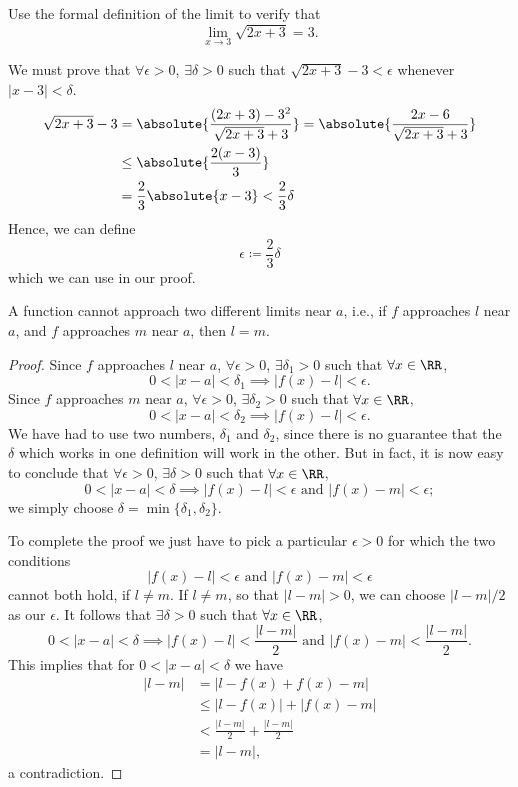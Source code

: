 \begin{exercise}
Use the formal definition of the limit to verify that 
\[ \lim_{x \to 3} \sqrt{2x+3} = 3. \]
\end{exercise}

We must prove that $\forall \epsilon > 0$, $\exists \delta > 0$ such that $\sqrt{2x+3} - 3 < \epsilon$ whenever $|x-3|<\delta$.
\begin{align*}
\sqrt{2x+3} - 3 &= \absolute{\frac{(2x+3)-3^2}{\sqrt{2x+3} + 3}} = \absolute{\frac{2x-6}{\sqrt{2x+3} + 3}} \\
&\le \absolute{\frac{2(x-3)}{3}} \\
&= \frac{2}{3} \absolute{x-3} < \frac{2}{3} \delta
\end{align*}
Hence, we can define 
\[ \epsilon \coloneqq \frac{2}{3} \delta \]
which we can use in our proof.

\begin{proposition}
A function cannot approach two different limits near $a$, i.e., if $f$ approaches $l$ near $a$, and $f$ approaches $m$ near $a$, then $l=m$.
\end{proposition}

\begin{proof}
Since $f$ approaches $l$ near $a$, $\forall\epsilon>0$, $\exists\delta_1>0$ such that $\forall x\in\RR$,
\[0<|x-a|<\delta_1\implies|f(x)-l|<\epsilon.\]
Since $f$ approaches $m$ near $a$, $\forall\epsilon>0$, $\exists\delta_2>0$ such that $\forall x\in\RR$,
\[0<|x-a|<\delta_2\implies|f(x)-l|<\epsilon.\]
We have had to use two numbers, $\delta_1$ and $\delta_2$, since there is no guarantee that the $\delta$ which works in one definition will work in the other. But in fact, it is now easy to conclude that $\forall\epsilon>0$, $\exists\delta>0$ such that $\forall x\in\RR$,
\[0<|x-a|<\delta\implies|f(x)-l|<\epsilon\text{ and }|f(x)-m|<\epsilon;\]
we simply choose $\delta=\min\{\delta_1,\delta_2\}$.

To complete the proof we just have to pick a particular $\epsilon>0$ for which the two conditions
\[|f(x)-l|<\epsilon\text{ and }|f(x)-m|<\epsilon\]
cannot both hold, if $l\neq m$. If $l\neq m$, so that $|l-m|>0$, we can choose $|l-m|/2$ as our $\epsilon$. It follows that $\exists\delta>0$ such that $\forall x\in\RR$,
\[0<|x-a|<\delta\implies|f(x)-l|<\frac{|l-m|}{2}\text{ and }|f(x)-m|<\frac{|l-m|}{2}.\]
This implies that for $0<|x-a|<\delta$ we have
\begin{align*}
|l-m|&=|l-f(x)+f(x)-m|\\
&\le|l-f(x)|+|f(x)-m|\\
&<\frac{|l-m|}{2}+\frac{|l-m|}{2}\\
&=|l-m|,
\end{align*}
a contradiction.
\end{proof}
\pagebreak

